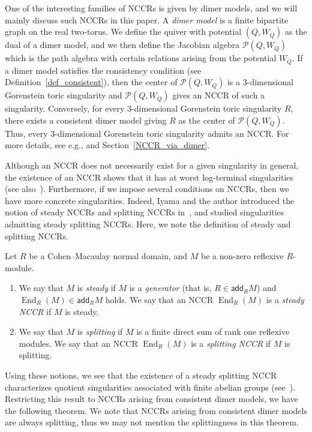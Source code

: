 \documentclass[ALCO,ThmDefs,Unicode]{cedram}
\newcommand{\calP}{\mathcal{P}}
\DeclareMathOperator{\End}{End}
\newcommand{\add}{\mathsf{add}}
\begin{document}

One of the interesting families of NCCRs is given by dimer models, and we will mainly discuss such NCCRs in this paper. A \emph{dimer model} is a finite bipartite graph on the real two-torus. We define the quiver with potential $(Q, W_Q)$ as the dual of a dimer model, and we then define the Jacobian algebra $\calP(Q, W_Q)$ which is the path algebra with certain relations arising from the potential $W_Q$. If a dimer model satisfies the consistency condition (see Definition~\ref{def_consistent}), then the center of $\calP(Q, W_Q)$ is a $3$-dimensional Gorenstein toric singularity and $\calP(Q, W_Q)$ gives an NCCR of such a singularity. Conversely, for every $3$-dimensional Gorenstein toric singularity $R$, there exists a consistent dimer model giving $R$ as the center of $\calP(Q, W_Q)$. Thus, every $3$-dimensional Gorenstein toric singularity admits an NCCR. For more details, see e.g., \cite{Boc4,Bro,IU2} and Section~\ref{NCCR_via_dimer}.

Although an NCCR does not necessarily exist for a given singularity in general, the existence of an NCCR shows that it has at worst log-terminal singularities~\cite{DITW} (see also~\cite{DITV,StVdB}). Furthermore, if we impose several conditions on NCCRs, then we have more concrete singularities. Indeed, Iyama and the author introduced the notion of steady NCCRs and splitting NCCRs in~\cite{IN}, and studied singularities admitting steady splitting NCCRs. Here, we note the definition of steady and splitting NCCRs.

\begin{defi}\label{def_steady}
Let $R$ be a Cohen--Macaulay normal domain, and $M$ be a non-zero reflexive $R$-module.
\begin{enumerate}%
\item We say that $M$ is \emph{steady} if $M$ is a \emph{generator} (that is, $R\in\add_RM$) and $\End_R(M)\in\add_RM$ holds. We say that an NCCR $\End_R(M)$ is a \emph{steady NCCR} if $M$ is steady.
\item We say that $M$ is \emph{splitting} if $M$ is a finite direct sum of rank one reflexive modules. We say that an NCCR $\End_R(M)$ is a \emph{splitting NCCR} if $M$ is splitting.
\end{enumerate}
\end{defi}

Using these notions, we see that the existence of a steady splitting NCCR characterizes quotient singularities associated with finite abelian groups (see~\cite[Theorem~3.1]{IN}). Restricting this result to NCCRs arising from consistent dimer models, we have the following theorem. We note that NCCRs arising from consistent dimer models are always splitting, thus we may not mention the splittingness in this theorem.
\end{document}
